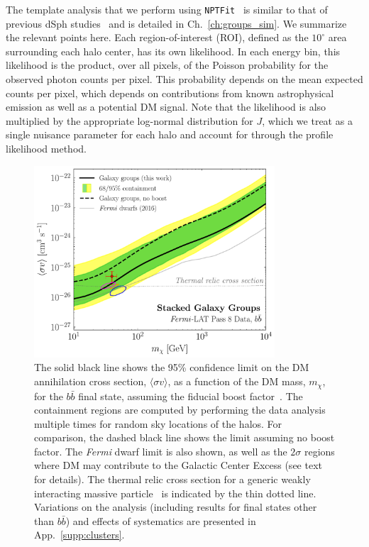 The template analysis that we perform using \texttt{NPTFit}~\cite{Mishra-Sharma:2016gis} is similar to that of previous dSph studies~\cite{Ackermann:2015zua,Fermi-LAT:2016uux}  and is detailed in Ch.~\ref{ch:groups_sim}.  We summarize the relevant points here.  Each region-of-interest (ROI), defined as the $10^\circ$ area surrounding each halo center, has its own likelihood.  In each energy bin, this  likelihood is the product, over all pixels, of the Poisson probability for the observed photon counts per pixel.  This probability depends on the mean expected counts per pixel, which depends on contributions from known astrophysical emission as well as a potential DM signal. Note that the likelihood is also multiplied by the appropriate log-normal distribution for $J$, which we treat as a single nuisance parameter for each halo and account for through the profile likelihood method.  

\begin{figure}[t]
\centering
\includegraphics[width=0.8\textwidth]{ch-clusters/plots/bounds.pdf} \hspace{4mm}
\caption{The solid black line shows the 95\% confidence limit on the DM annihilation cross section, $\langle \sigma v \rangle$, as a function of the DM mass, $m_\chi$, for the $b \bar b$ final state, assuming the fiducial boost factor~\cite{Bartels:2015uba}. The containment regions are computed by performing the data analysis multiple times for random sky locations of the halos.  For comparison, the dashed black line shows the limit assuming no boost factor.  The {\it Fermi} dwarf limit is also shown, as well as the $2$$\sigma$ regions where DM may contribute to the Galactic Center Excess (see text for details).  The thermal relic cross section for a generic weakly interacting massive particle~\cite{Steigman:2012nb} is indicated by the thin dotted line. Variations on the analysis (including results for final states other than $b \bar b$) and effects of systematics are presented in App.~\ref{supp:clusters}.}
\label{fig:bounds1}
\end{figure}

